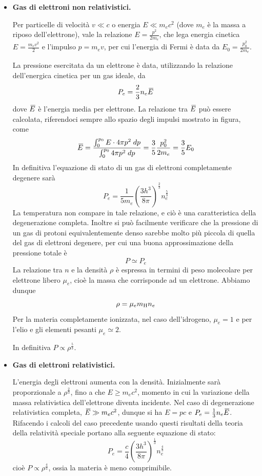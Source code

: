 \begin{itemize}
    \item \textbf{Gas di elettroni non relativistici.}
    
    Per particelle di velocità $v \ll c$ o energia $E \ll m_e c^2$ (dove $m_e$ è la massa a riposo dell'elettrone), vale la relazione $E=\frac{p^2}{2m_e}$, che lega energia cinetica $E=\frac{m_e v^2}{2}$ e l'impulso $p=m_e v$, per cui l'energia di Fermi è data da $E_0=\frac{p_0^2}{2m_e}$.

    La pressione esercitata da un elettrone è data, utilizzando la relazione dell'energica cinetica per un gas ideale, da
    $$P_e=\frac{2}{3}n_e {}\mkern3mu\overline{\mkern-3muE}$$
    dove ${}\mkern3mu\overline{\mkern-3muE}$ è l'energia media per elettrone. La relazione tra ${}\mkern3mu\overline{\mkern-3muE}$ può essere calcolata, riferendoci sempre allo spazio degli impulsi mostrato in figura, come
    $${}\mkern3mu\overline{\mkern-3muE}=\frac{\int_{0}^{p_0} E \cdot 4 \pi p^2 \; dp}{\int_{0}^{p_0} 4 \pi p^2 \; dp}
    =\frac{3}{5} \frac{p_0^2}{2 m_e}
    =\frac{3}{5} E_0$$
    In definitiva l'equazione di stato di un gas di elettroni completamente degenere sarà
    $$P_e=\frac{1}{5 m_e} \left( \frac{3h^3}{8 \pi} \right)^{\frac{2}{3}} n_e^{\frac{5}{3}}$$
    La temperatura non compare in tale relazione, e ciò è una caratteristica della degenerazione completa. Inoltre si può facilmente verificare che la pressione di un gas di protoni equivalentemente denso sarebbe molto più piccola di quella del gas di elettroni degenere, per cui una buona approssimazione della pressione totale è
    $$P \simeq P_e$$
    La relazione tra $n$ e la densità $\rho$ è espressa in termini di peso molecolare per elettrone libero $\mu_e$, cioè la massa che corrisponde ad un elettrone. Abbiamo dunque
    $$\rho=\mu_e m_{\rm H} n_e$$
    Per la materia completamente ionizzata, nel caso dell'idrogeno, $\mu_e=1$ e per l'elio e gli elementi pesanti $\mu_e \simeq 2$.
    
    In definitiva $P \propto \rho^{\frac{5}{3}}$.
    \item \textbf{Gas di elettroni relativistici.}
    
    L'energia degli elettroni aumenta con la densità. Inizialmente sarà proporzionale a $\rho^{\frac{2}{3}}$, fino a che $E \geq m_e c^2$, momento in cui la variazione della massa relativistica dell'elettrone diventa incidente. Nel caso di degenerazione relativistica completa, ${}\mkern3mu\overline{\mkern-3muE} \gg m_e c^2$, dunque si ha $E=pc$ e $P_e=\frac{1}{3}n_e {}\mkern3mu\overline{\mkern-3muE}$. Rifacendo i calcoli del caso precedente usando questi risultati della teoria della relatività speciale portano alla seguente equazione di stato:
    $$P_e=\frac{c}{4} \left( \frac{3h^3}{8 \pi} \right)^{\frac{1}{3}} n_e^{\frac{4}{3}}$$
    cioè $P \propto \rho^{\frac{4}{3}}$, ossia la materia è meno comprimibile.
\end{itemize}

